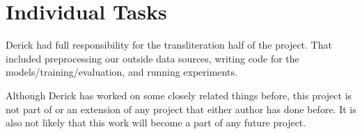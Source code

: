 \documentclass{article}
\begin{document}
\section*{Individual Tasks}

Derick had full responsibility for the transliteration half of the project.
That included preprocessing our outside data sources,
writing code for the models/training/evaluation,
and running experiments.

Although Derick has worked on some closely related things before,
this project is not part of or an extension of any project
that either author has done before.
It is also not likely that this work will become a part of any future project.


{}

\end{document}
